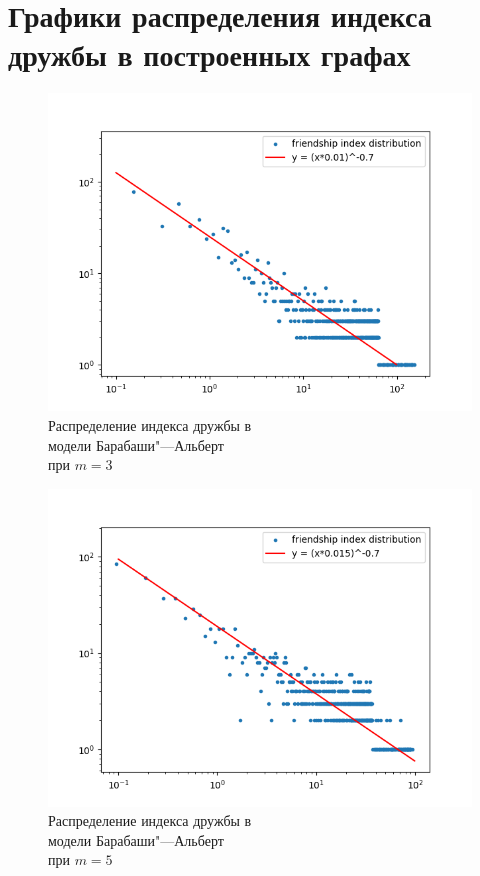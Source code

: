 \documentclass[bachelor, och, diploma]{SCWorks}
\begin{document}
\section{Графики распределения индекса дружбы в построенных графах}\label{app:dist}
\begin{figure}[!ht]
    \centering
    \includegraphics[scale=0.5]{diploma_results/static_log/ba_dist_beta_3.png}
    \caption{Распределение индекса дружбы  в\\ модели Барабаши"---Альберт\\ при $m=3$}
\end{figure}
\begin{figure}[!ht]
    \centering
    \includegraphics[scale=0.5]{diploma_results/static_log/ba_dist_beta_5.png}
    \caption{Распределение индекса дружбы  в\\ модели Барабаши"---Альберт\\ при $m=5$}
\end{figure}
\end{document}
